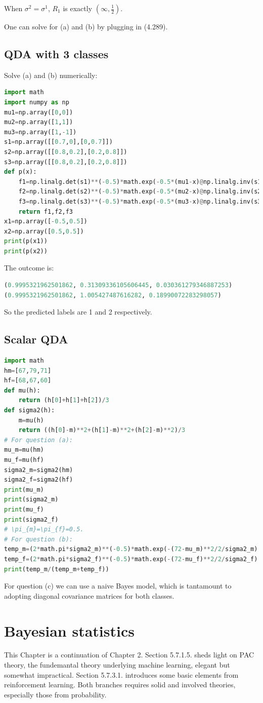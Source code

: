 \documentclass[UTF8]{ctexart}
\begin{document}
When $\sigma^{2}=\sigma^{1}$, $R_{1}$ is exactly $(\infty,\frac{1}{2})$.

One can solve for (a) and (b) by plugging in (4.289).

\subsection{QDA with 3 classes}
Solve (a) and (b) numerically:
\begin{lstlisting}[language=Python]
import math
import numpy as np
mu1=np.array([0,0])
mu2=np.array([1,1])
mu3=np.array([1,-1])
s1=np.array([[0.7,0],[0,0.7]])
s2=np.array([[0.8,0.2],[0.2,0.8]])
s3=np.array([[0.8,0.2],[0.2,0.8]])
def p(x):
    f1=np.linalg.det(s1)**(-0.5)*math.exp(-0.5*(mu1-x)@np.linalg.inv(s1)@(mu1-x))
    f2=np.linalg.det(s2)**(-0.5)*math.exp(-0.5*(mu2-x)@np.linalg.inv(s2)@(mu2-x))
    f3=np.linalg.det(s3)**(-0.5)*math.exp(-0.5*(mu3-x)@np.linalg.inv(s3)@(mu3-x))
    return f1,f2,f3
x1=np.array([-0.5,0.5])
x2=np.array([0.5,0.5])
print(p(x1))
print(p(x2))
\end{lstlisting}
The outcome is:
\begin{lstlisting}[language=Python]
(0.9995321962501862, 0.31309336105606445, 0.030361279346887253)
(0.9995321962501862, 1.005427487616282, 0.18990072283298057)
\end{lstlisting}
So the predicted labels are 1 and 2 respectively.


\subsection{Scalar QDA}
\begin{lstlisting}[language=Python]
import math
hm=[67,79,71]
hf=[68,67,60]
def mu(h):
    return (h[0]+h[1]+h[2])/3
def sigma2(h):
    m=mu(h)
    return ((h[0]-m)**2+(h[1]-m)**2+(h[2]-m)**2)/3
# For question (a):
mu_m=mu(hm)
mu_f=mu(hf)
sigma2_m=sigma2(hm)
sigma2_f=sigma2(hf)
print(mu_m)
print(sigma2_m)
print(mu_f)
print(sigma2_f)
# \pi_{m}=\pi_{f}=0.5.
# For question (b):
temp_m=(2*math.pi*sigma2_m)**(-0.5)*math.exp(-(72-mu_m)**2/2/sigma2_m)
temp_f=(2*math.pi*sigma2_f)**(-0.5)*math.exp(-(72-mu_f)**2/2/sigma2_f)
print(temp_m/(temp_m+temp_f))
\end{lstlisting}
For question (c) we can use a naive Bayes model, which is tantamount to adopting diagonal covariance matrices for both classes.


\newpage
\section{Bayesian statistics}
This Chapter is a continuation of Chapter 2.
Section 5.7.1.5. sheds light on PAC theory, the fundemantal theory underlying machine learning, elegant but somewhat impractical.
Section 5.7.3.1. introduces some basic elements from reinforcement learning.
Both branches requires solid and involved theories, especially those from probability.
\end{document}
